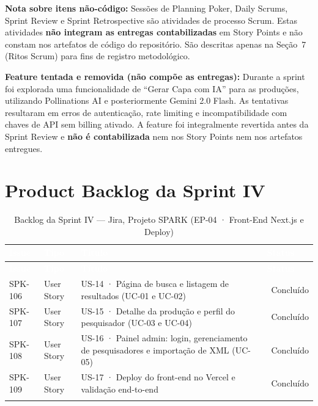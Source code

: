 \documentclass[12pt,a4paper]{article}
\newcommand{\cmark}{\textcolor{sparkgreen}{\ding{51}}}
\begin{document}
\vspace{0.3cm}
\noindent\textbf{Nota sobre itens não-código:} Sessões de Planning Poker, Daily Scrums, Sprint Review e
Sprint Retrospective são atividades de processo Scrum. Estas atividades \textbf{não integram as entregas
contabilizadas} em Story Points e não constam nos artefatos de código do repositório. São descritas apenas
na Seção~7 (Ritos Scrum) para fins de registro metodológico.

\vspace{0.3cm}
\noindent\textbf{Feature tentada e removida (não compõe as entregas):} Durante a sprint foi explorada uma
funcionalidade de ``Gerar Capa com IA'' para as produções, utilizando Pollinations AI e posteriormente
Gemini 2.0 Flash. As tentativas resultaram em erros de autenticação, rate limiting e incompatibilidade
com chaves de API sem billing ativado. A feature foi integralmente revertida antes da Sprint Review e
\textbf{não é contabilizada} nem nos Story Points nem nos artefatos entregues.

\section{Product Backlog da Sprint IV}

\vspace{0.3cm}
\begin{longtable}{C{1.6cm} C{1.8cm} L{7.5cm} C{2cm}}
  \toprule
  \textcolor{white}{\textbf{Issue}} &
  \textcolor{white}{\textbf{Tipo}} &
  \textcolor{white}{\textbf{Título}} &
  \textcolor{white}{\textbf{Status}} \\
  \midrule
  \endfirsthead
  \toprule
  \textcolor{white}{\textbf{Issue}} &
  \textcolor{white}{\textbf{Tipo}} &
  \textcolor{white}{\textbf{Título}} &
  \textcolor{white}{\textbf{Status}} \\
  \midrule
  \endhead
  SPK-106 & User Story & US-14 · Página de busca e listagem de resultados (UC-01 e UC-02) & \cmark\ Concluído \\
  SPK-107 & User Story & US-15 · Detalhe da produção e perfil do pesquisador (UC-03 e UC-04) & \cmark\ Concluído \\
  SPK-108 & User Story & US-16 · Painel admin: login, gerenciamento de pesquisadores e importação de XML (UC-05) & \cmark\ Concluído \\
  SPK-109 & User Story & US-17 · Deploy do front-end no Vercel e validação end-to-end & \cmark\ Concluído \\
  \bottomrule
  \caption{Backlog da Sprint IV — Jira, Projeto SPARK (EP-04 · Front-End Next.js e Deploy)}
\end{longtable}
\end{document}

